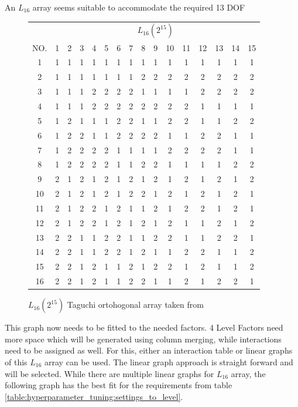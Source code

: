 An $L_{16}$ array seems suitable to accommodate the required 13 DOF


\begin{figure}[H]
	\centering
\begin{tabular}{ |c||c|c|c|c|c|c|c|c|c|c|c|c|c|c|c|  }
	\hline
	   & \multicolumn{15}{|c|}{ $L_{16}(2^{15})$ } \\
	NO.& 1 & 2 & 3 & 4 & 5 & 6 & 7 & 8 & 9 & 10& 11& 12& 13& 14&15\\
	\hline
	1  & 1 & 1 & 1 & 1 & 1 & 1 & 1 & 1 & 1 & 1 & 1 & 1 & 1 & 1 & 1\\
	2  & 1 & 1 & 1 & 1 & 1 & 1 & 1 & 2 & 2 & 2 & 2 & 2 & 2 & 2 & 2\\
	3  & 1 & 1 & 1 & 2 & 2 & 2 & 2 & 1 & 1 & 1 & 1 & 2 & 2 & 2 & 2\\
	4  & 1 & 1 & 1 & 2 & 2 & 2 & 2 & 2 & 2 & 2 & 2 & 1 & 1 & 1 & 1\\
	5  & 1 & 2 & 1 & 1 & 1 & 2 & 2 & 1 & 1 & 2 & 2 & 1 & 1 & 2 & 2\\
	6  & 1 & 2 & 2 & 1 & 1 & 2 & 2 & 2 & 2 & 1 & 1 & 2 & 2 & 1 & 1\\
	7  & 1 & 2 & 2 & 2 & 2 & 1 & 1 & 1 & 1 & 2 & 2 & 2 & 2 & 1 & 1\\
	8  & 1 & 2 & 2 & 2 & 2 & 1 & 1 & 2 & 2 & 1 & 1 & 1 & 1 & 2 & 2\\
	9  & 2 & 1 & 2 & 1 & 2 & 1 & 2 & 1 & 2 & 1 & 2 & 1 & 2 & 1 & 2\\
	10 & 2 & 1 & 2 & 1 & 2 & 1 & 2 & 2 & 1 & 2 & 1 & 2 & 1 & 2 & 1\\
	11 & 2 & 1 & 2 & 2 & 1 & 2 & 1 & 1 & 2 & 1 & 2 & 2 & 1 & 2 & 1\\
	12 & 2 & 1 & 2 & 2 & 1 & 2 & 1 & 2 & 1 & 2 & 1 & 1 & 2 & 1 & 2\\
	13 & 2 & 2 & 1 & 1 & 2 & 2 & 1 & 1 & 2 & 2 & 1 & 1 & 2 & 2 & 1\\
	14 & 2 & 2 & 1 & 1 & 2 & 2 & 1 & 2 & 1 & 1 & 2 & 2 & 1 & 1 & 2\\
	15 & 2 & 2 & 1 & 2 & 1 & 1 & 2 & 1 & 2 & 2 & 1 & 2 & 1 & 1 & 2\\
	16 & 2 & 2 & 1 & 2 & 1 & 1 & 2 & 2 & 1 & 1 & 2 & 1 & 2 & 2 & 1\\
	\hline
\end{tabular}
\caption{ $L_{16}(2^{15})$ Taguchi ortohogonal array taken from \cite{roy_primer_1990}}
\end{figure}


This graph now needs to be fitted to the needed factors. 4 Level Factors need more space which will be generated using column merging, while interactions need to be assigned as well.
For this, either an interaction table or linear graphs of this $L_{16}$ array can be used. The linear graph approach is straight forward and will be selected. While there are multiple linear graphs for $L_{16}$ array, the following graph has the best fit for the requirements from table \ref{table:hyperparameter_tuning:settings_to_level}.

